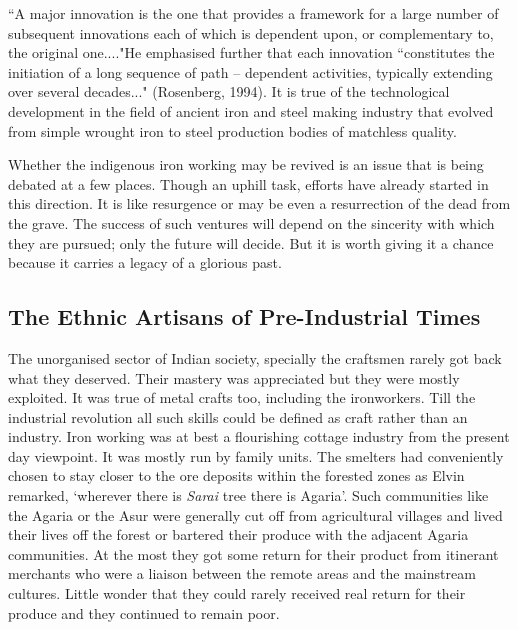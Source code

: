 \newpage

``A major innovation is the one that provides a framework for a large number of subsequent innovations each of which is dependent upon, or complementary to, the original one...."He emphasised further that each innovation ``constitutes the initiation of a long sequence of path – dependent activities, typically extending over several decades..." (Rosenberg, 1994). It is true of the technological development in the field of ancient iron and steel making industry that evolved from simple wrought iron to steel production bodies of matchless quality.

Whether the indigenous iron working may be revived is an issue that is being debated at a few places. Though an uphill task, efforts have already started in this direction. It is like resurgence or may be even a resurrection of the dead from the grave. The success of such ventures will depend on the sincerity with which they are pursued; only the future will decide. But it is worth giving it a chance because it carries a legacy of a glorious past.

\vspace{-.3cm}

\subsection*{The Ethnic Artisans of Pre-Industrial Times}\label{chapter8-subsection-7}

\vspace{-.2cm}

The unorganised sector of Indian society, specially the craftsmen rarely got back what they deserved. Their mastery was appreciated but they were mostly exploited. It was true of metal crafts too, including the ironworkers. Till the industrial revolution all such skills could be defined as craft rather than an industry. Iron working was at best a flourishing cottage industry from the present day viewpoint. It was mostly run by family units. The smelters had conveniently chosen to stay closer to the ore deposits within the forested zones as Elvin remarked, `wherever there is {\it Sarai} tree there is Agaria'. Such communities like the Agaria or the Asur were generally cut off from agricultural villages and lived their lives off the forest or bartered their produce with the adjacent Agaria communities. At the most they got some return for their product from itinerant merchants who were a liaison between the remote areas and the mainstream cultures. Little wonder that they could rarely received real return for their produce and they continued to remain poor. 

